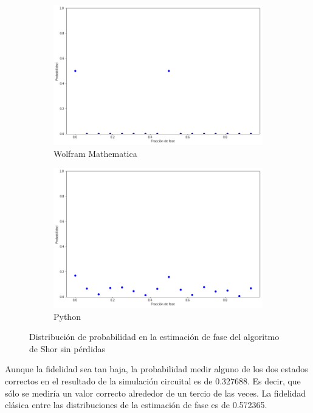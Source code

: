 \begin{figure}[H]
    \centering
    \begin{subfigure}[m]{0.45\textwidth}
        \centering
        \includegraphics[width=0.9\linewidth]{img/ShorM8.png}
        \caption{Wolfram Mathematica}
    \end{subfigure}
    \begin{subfigure}[m]{0.45\textwidth}
        \centering
        \includegraphics[width=0.9\linewidth]{img/shor2lossless.png}
        \caption{Python}
    \end{subfigure}
    \caption[Distribución de probabilidad en la estimación de fase del algoritmo de Shor sin pérdidas]{Distribución de probabilidad en la estimación de fase del algoritmo de Shor sin pérdidas}
    \label{fig:shor8}
\end{figure}

Aunque la fidelidad sea tan baja, la probabilidad medir alguno de los dos estados correctos en el resultado de la simulación circuital es de 0.327688. Es decir, que sólo se mediría un valor correcto alrededor de un tercio de las veces. La fidelidad clásica entre las distribuciones de la estimación de fase es de 0.572365.

